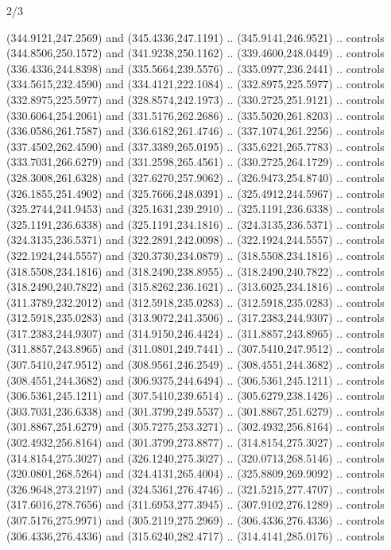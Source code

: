 \begin{flagdescription}{2/3}
\begin{scope}[xshift=0.5\flaglength,yshift=0.5\flagwidth,scale=\flagwidth/318.91]
\begin{scope}[y=0.8pt, x=0.8pt, yscale=-1,shift={(-298.97,-199.32)}]
  (344.9121,247.2569) and (345.4336,247.1191) .. (345.9141,246.9521) .. controls
  (344.8506,250.1572) and (341.9238,250.1162) .. (339.4600,248.0449) .. controls
  (336.4336,244.8398) and (335.5664,239.5576) .. (335.0977,236.2441) .. controls
  (334.5615,232.4590) and (334.4121,222.1084) .. (332.8975,225.5977) .. controls
  (332.8975,225.5977) and (328.8574,242.1973) .. (330.2725,251.9121) .. controls
  (330.6064,254.2061) and (331.5176,262.2686) .. (335.5020,261.8203) .. controls
  (336.0586,261.7587) and (336.6182,261.4746) .. (337.1074,261.2256) .. controls
  (337.4502,262.4590) and (337.3389,265.0195) .. (335.6221,265.7783) .. controls
  (333.7031,266.6279) and (331.2598,265.4561) .. (330.2725,264.1729) .. controls
  (328.3008,261.6328) and (327.6270,257.9062) .. (326.9473,254.8740) .. controls
  (326.1855,251.4902) and (325.7666,248.0391) .. (325.4912,244.5967) .. controls
  (325.2744,241.9453) and (325.1631,239.2910) .. (325.1191,236.6338) .. controls
  (325.1191,236.6338) and (325.1191,234.1816) .. (324.3135,236.5371) .. controls
  (324.3135,236.5371) and (322.2891,242.0098) .. (322.1924,244.5557) .. controls
  (322.1924,244.5557) and (320.3730,234.0879) .. (318.5508,234.1816) .. controls
  (318.5508,234.1816) and (318.2490,238.8955) .. (318.2490,240.7822) .. controls
  (318.2490,240.7822) and (315.8262,236.1621) .. (313.6025,234.1816) .. controls
  (311.3789,232.2012) and (312.5918,235.0283) .. (312.5918,235.0283) .. controls
  (312.5918,235.0283) and (313.9072,241.3506) .. (317.2383,244.9307) .. controls
  (317.2383,244.9307) and (314.9150,246.4424) .. (311.8857,243.8965) .. controls
  (311.8857,243.8965) and (311.0801,249.7441) .. (307.5410,247.9512) .. controls
  (307.5410,247.9512) and (308.9561,246.2549) .. (308.4551,244.3682) .. controls
  (308.4551,244.3682) and (306.9375,244.6494) .. (306.5361,245.1211) .. controls
  (306.5361,245.1211) and (307.5410,239.6514) .. (305.6279,238.1426) .. controls
  (303.7031,236.6338) and (301.3799,249.5537) .. (301.8867,251.6279) .. controls
  (301.8867,251.6279) and (305.7275,253.3271) .. (302.4932,256.8164) .. controls
  (302.4932,256.8164) and (301.3799,273.8877) .. (314.8154,275.3027) .. controls
  (314.8154,275.3027) and (326.1240,275.3027) .. (320.0713,268.5146) .. controls
  (320.0801,268.5264) and (324.4131,265.4004) .. (325.8809,269.9092) .. controls
  (326.9648,273.2197) and (324.5361,276.4746) .. (321.5215,277.4707) .. controls
  (317.6016,278.7656) and (311.6953,277.3945) .. (307.9102,276.1289) .. controls
  (307.5176,275.9971) and (305.2119,275.2969) .. (306.4336,276.4336) .. controls
  (306.4336,276.4336) and (315.6240,282.4717) .. (314.4141,285.0176) .. controls

\end{scope}
\end{scope}
\end{flagdescription}
